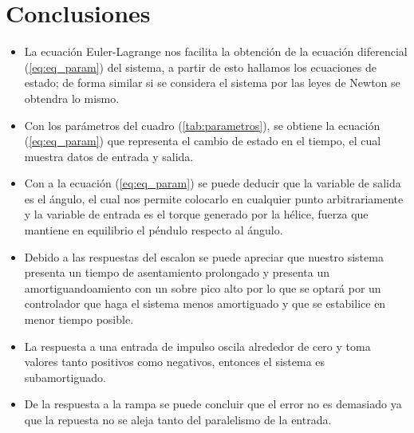 \documentclass[12pt]{article}
\begin{document}
\section{Conclusiones}
\begin{itemize}
    \item La ecuación Euler-Lagrange nos facilita la obtención de la ecuación diferencial (\ref{eq:eq_param}) del sistema, a partir de esto hallamos los ecuaciones de estado; de forma similar si se considera el sistema por las leyes de Newton se obtendra lo mismo.
    \item Con los parámetros del cuadro (\ref{tab:parametros}), se obtiene la ecuación (\ref{eq:eq_param}) que representa el cambio de estado en el tiempo, el cual muestra datos de entrada y salida.
    \item Con a la ecuación (\ref{eq:eq_param}) se puede deducir que la variable de salida es el ángulo, el cual nos permite colocarlo en cualquier punto arbitrariamente y la variable de entrada es el torque generado por la hélice, fuerza que mantiene en equilibrio el péndulo respecto al ángulo.
    \item Debido a las respuestas del escalon se puede apreciar que nuestro sistema presenta un tiempo de asentamiento prolongado y presenta un amortiguandoamiento con un sobre pico alto por lo que se optará por un controlador que haga el sistema menos amortiguado y que se estabilice en menor tiempo posible.
    \item La respuesta a una entrada de impulso oscila alrededor de cero y toma valores tanto positivos como negativos, entonces el sistema es subamortiguado.
    \item De la respuesta a la rampa se puede concluir que el error no es demasiado ya que la repuesta no se aleja tanto del paralelismo de la entrada.
\end{itemize}


\end{document}
